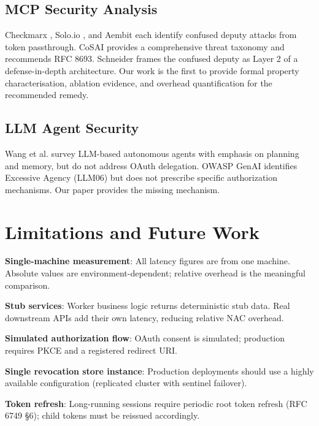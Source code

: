 \documentclass[journal]{IEEEtran}
\begin{document}
\subsection{MCP Security Analysis}

Checkmarx \cite{checkmarx_mcp}, Solo.io \cite{solo_mcp}, and Aembit
\cite{aembit_mcp} each identify confused deputy attacks from token passthrough.
CoSAI \cite{cosai_mcp} provides a comprehensive threat taxonomy and recommends
RFC 8693. Schneider \cite{schneider_mcp} frames the confused deputy as Layer 2
of a defense-in-depth architecture. Our work is the first to provide formal
property characterisation, ablation evidence, and overhead quantification for the
recommended remedy.

\subsection{LLM Agent Security}

Wang et al. \cite{wang2024survey} survey LLM-based autonomous agents with
emphasis on planning and memory, but do not address OAuth delegation. OWASP GenAI
\cite{owasp_genai} identifies Excessive Agency (LLM06) but does not prescribe
specific authorization mechanisms. Our paper provides the missing mechanism.


\section{Limitations and Future Work}
\label{sec:limitations}

\textbf{Single-machine measurement}: All latency figures are from one machine.
Absolute values are environment-dependent; relative overhead is the meaningful
comparison.

\textbf{Stub services}: Worker business logic returns deterministic stub data.
Real downstream APIs add their own latency, reducing relative NAC overhead.

\textbf{Simulated authorization flow}: OAuth consent is simulated; production
requires PKCE \cite{rfc7636} and a registered redirect URI.

\textbf{Single revocation store instance}: Production deployments should use a
highly available configuration (replicated cluster with sentinel failover).

\textbf{Token refresh}: Long-running sessions require periodic root token refresh
(RFC 6749 §6); child tokens must be reissued accordingly.
\end{document}
